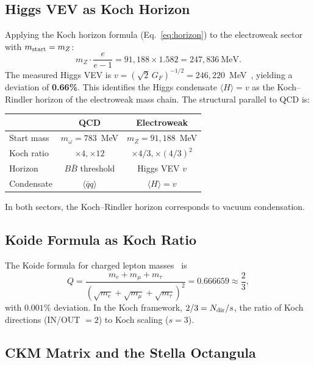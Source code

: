 \documentclass[twocolumn,showpacs,preprintnumbers,amsmath,amssymb,prl]{revtex4-2}
\begin{document}
\subsection{Higgs VEV as Koch Horizon}

Applying the Koch horizon formula (Eq.~\ref{eq:horizon}) to the electroweak
sector with $m_{\rm start} = m_Z$:
\begin{equation}
    m_Z \cdot \frac{e}{e-1} = 91{,}188 \times 1.582 = 247{,}836~\text{MeV}.
    \label{eq:higgs_horizon}
\end{equation}
The measured Higgs VEV is $v = (\sqrt{2}\,G_F)^{-1/2} = 246{,}220$~MeV~\cite{PDG2024}, yielding a deviation of \textbf{0.66\%}.
This identifies the Higgs condensate $\langle H\rangle = v$ as the Koch--Rindler
horizon of the electroweak mass chain. The structural parallel to QCD is:
\begin{center}
\begin{tabular}{lcc}
\hline\hline
& QCD & Electroweak \\
\hline
Start mass & $m_\omega = 783$~MeV & $m_Z = 91{,}188$~MeV \\
Koch ratio & $\times 4, \times 12$ & $\times 4/3, \times (4/3)^2$ \\
Horizon & $B\bar{B}$ threshold & Higgs VEV $v$ \\
Condensate & $\langle\bar{q}q\rangle$ & $\langle H\rangle = v$ \\
\hline\hline
\end{tabular}
\end{center}
In both sectors, the Koch--Rindler horizon corresponds to vacuum condensation.

\subsection{Koide Formula as Koch Ratio}

The Koide formula for charged lepton masses~\cite{Koide1983} is
\begin{equation}
    Q = \frac{m_e + m_\mu + m_\tau}
    {\left(\sqrt{m_e} + \sqrt{m_\mu} + \sqrt{m_\tau}\right)^2}
    = 0.666659 \approx \frac{2}{3},
    \label{eq:koide}
\end{equation}
with $0.001\%$ deviation. In the Koch framework,
$2/3 = N_{\rm dir}/s$, the ratio of Koch directions (IN/OUT $= 2$)
to Koch scaling ($s = 3$).

\subsection{CKM Matrix and the Stella Octangula}
\end{document}
